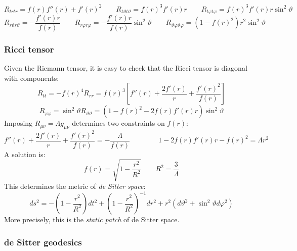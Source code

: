 \begin{equation*}
  R_{trtr} = f(r) f''(r) + f'(r)^2
  \qquad
  R_{t \vartheta t \vartheta} = f(r)^3 f'(r) r
  \qquad
  R_{t \varphi t \varphi} = f(r)^3 f'(r) r \sin^2 \vartheta
\end{equation*}
\begin{equation*}
  R_{r \vartheta r \vartheta} = - \frac{f'(r) r}{f(r)}
  \qquad
  R_{r \varphi r \varphi} = - \frac{f'(r) r}{f(r)} \sin^2 \vartheta
  \qquad
  R_{\vartheta \varphi \vartheta \varphi} = (1 - f(r)^2) r^2 \sin^2 \vartheta
\end{equation*}

\subsubsection{Ricci tensor}

Given the Riemann tensor, it is easy to check that the Ricci tensor is diagonal with components:
\begin{equation*}
  R_{tt} = - f(r)^4 R_{rr} = f(r)^3 \left[ f''(r) + \frac{2f'(r)}{r} + \frac{f'(r)^2}{f(r)} \right]
\end{equation*}
\begin{equation*}
  R_{\varphi \varphi} = \sin^2 \vartheta R_{\vartheta \vartheta} = (1 - f(r)^2 - 2 f(r) f'(r) r) \sin^2 \vartheta
\end{equation*}
Imposing $ R_{\mu \nu} = \Lambda g_{\mu \nu} $ determines two constraints on $ f(r) $:
\begin{equation*}
  f''(r) + \frac{2f'(r)}{r} + \frac{f'(r)^2}{f(r)} = - \frac{\Lambda}{f(r)}
  \qquad \qquad
  1 - 2 f(r) f'(r) r - f(r)^2 = \Lambda r^2
\end{equation*}
A solution is:
\begin{equation*}
  f(r) = \sqrt{1 - \frac{r^2}{R^2}}
  \qquad
  R^2 = \frac{3}{\Lambda}
\end{equation*}
This determines the metric of \textit{de Sitter space}:
\begin{equation}
  ds^2 = - \left( 1 - \frac{r^2}{R^2} \right) dt^2 + \left( 1 - \frac{r^2}{R^2} \right)^{-1} dr^2 + r^2 (d\vartheta^2 + \sin^2 \vartheta d\varphi^2)
  \label{eq:4.14}
\end{equation}
More precisely, this is the \textit{static patch} of de Sitter space.

\subsubsection{de Sitter geodesics}

